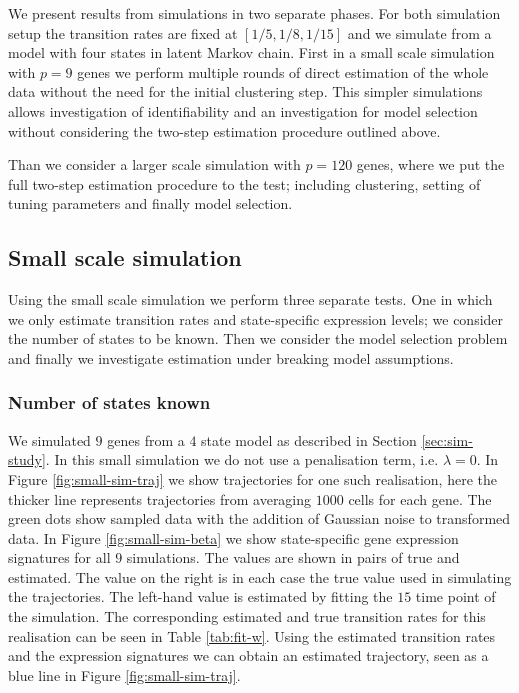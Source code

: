We present results from simulations in two separate phases. For both simulation setup the transition rates are fixed at $[1/5, 1/8, 1/15]$ and we simulate from a model with four states in latent Markov chain. First in a small scale simulation with $p=9$ genes we perform multiple rounds of direct estimation of the whole data without the need for the initial clustering step. This simpler simulations allows investigation of identifiability and an investigation for model selection without considering the two-step estimation procedure outlined above.

Than we consider a larger scale simulation with $p=120$ genes, where we put the full two-step estimation procedure to the test; including clustering, setting of tuning parameters and finally model selection.



\subsection{Small scale simulation}
\label{sec:small-scale-model}

Using the small scale simulation we perform three separate  tests. One in which we only estimate transition rates and state-specific expression levels; we consider the number of states to be known. Then we consider the model selection problem and finally we investigate estimation under breaking model assumptions.

\subsubsection{Number of states known}
\label{sec:number-states-known}

We simulated $9$ genes from a $4$ state model as described in Section \ref{sec:sim-study}. In this small simulation we do not use a penalisation term, i.e. $\lambda=0$. In Figure \ref{fig:small-sim-traj} we show trajectories for one such realisation, here the thicker line represents trajectories from averaging $1000$ cells for each gene. The green dots show sampled data with the addition of Gaussian noise to transformed data. In Figure \ref{fig:small-sim-beta} we show state-specific gene expression signatures for all $9$ simulations. The values are shown in pairs of true and estimated. The value on the right is in each case the true value used in simulating the trajectories. The left-hand value is estimated by fitting the $15$ time point of the simulation. The corresponding estimated and true transition rates for this realisation can be seen in Table \ref{tab:fit-w}. Using the estimated transition rates and the expression signatures we can obtain an estimated trajectory, seen as a blue line in Figure \ref{fig:small-sim-traj}.

